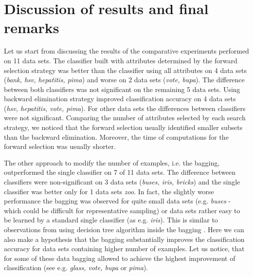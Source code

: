 \documentclass{elsart}
\begin{document}
\section{Discussion of results and final remarks}

Let us start from discussing the results of the comparative experiments
performed on 11 data sets. The classifier built with attributes determined
by the forward selection strategy was better than the classifier using all
attributes on 4 data sets (\emph{bank, hsv, hepatitis, pima}) and worse on 2
data sets (\emph{vote, bupa}). The difference between both classifiers was
not significant on the remaining 5 data sets. Using backward elimination
strategy improved classification accuracy on 4 data sets (\emph{hsv,
hepatitis, vote, pima}). For other data sets the differences between
classifiers were not significant. Comparing the number of attributes
selected by each search strategy, we noticed that the forward selection
usually identified smaller subsets than the backward elimination. Moreover,
the time of computations for the forward selection was usually shorter.

The other approach to modify the number of examples, i.e. the bagging,
 outperformed the single classifier on 7 of 11 data sets. The
 difference between classifiers were non-significant on 3 data sets
(\emph{buses, iris, bricks}) and the single classifier was better
only for 1 data sets \emph{zoo}. In fact, the slightly worse
 performance the bagging was observed for quite small data sets
(e.g. \emph{buses} - which could be difficult for representative sampling)
or data sets rather easy to be learned by a standard single classifier (as
e.g. \emph{iris}). This is similar to observations from using decision tree
algorithm inside the bagging \cite{Q96}. Here we can also make a hypothesis
that the bagging substantially improves the classification accuracy for data
sets containing higher number of examples. Let us notice, that for some of
these data bagging allowed to achieve the highest improvement of
classification (see e.g. \emph{glass, vote, bupa} or \emph{pima}).
\end{document}
